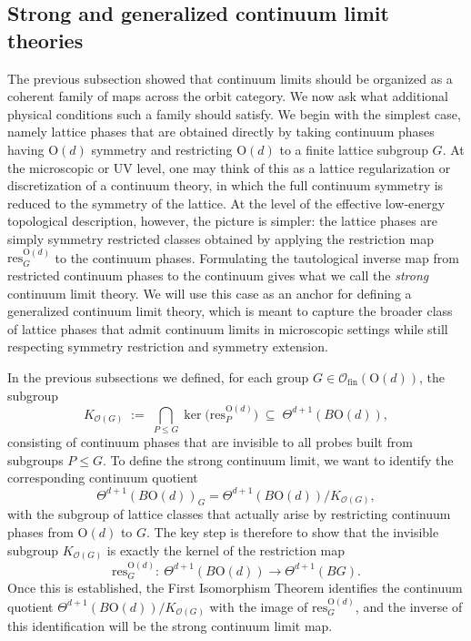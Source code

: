 \documentclass[aps,prx,reprint,superscriptaddress,twocolumn,amsmath,amssymb,amsfonts, nofootinbib]{revtex4-2}
\newcommand{\ofin}{\mathcal{O}_{\text{fin}}}
\newcommand{\res}{\text{res}}
\theoremstyle{apsstyle}
\begin{document}
\subsection{Strong and generalized continuum limit theories} 
\label{sec:strong_continuum_limit}
The previous subsection showed that continuum limits should be organized as a coherent family of maps across the orbit category. We now ask what additional physical conditions such a family should satisfy. We begin with the simplest case, namely lattice phases that are obtained directly by taking continuum phases having $\mathrm{O}(d)$ symmetry and restricting $\mathrm{O}(d)$ to a finite lattice subgroup $G$. At the microscopic or UV level, one may think of this as a lattice regularization or discretization of a continuum theory, in which the full continuum symmetry is reduced to the symmetry of the lattice.  At the level of the effective low-energy topological description, however, the picture is simpler: the lattice phases are simply symmetry restricted classes obtained by applying the restriction map $\res^{\mathrm{O}(d)}_{G}$ to the continuum phases. Formulating the tautological inverse map from restricted continuum phases to the continuum gives what we call the \emph{strong} continuum limit theory. We will use this case as an anchor for defining a generalized continuum limit theory, which is meant to capture the broader class of lattice phases that admit continuum limits in microscopic settings while still respecting symmetry restriction and symmetry extension.

\bigskip 

In the previous subsections we defined, for each group $G\in\ofin(\mathrm{O}(d))$, the subgroup
\begin{equation*}
    K_{\mathcal{O}(G)}
    \;:=\;
    \bigcap_{P\le G}\ker\bigl(\res^{\mathrm{O}(d)}_{P}\bigr)
    \;\subseteq\;
    \Theta^{d+1}(B\mathrm{O}(d)),
\end{equation*}
consisting of continuum phases that are invisible to all probes built from subgroups $P\le G$.  To define the strong continuum limit, we want to identify the corresponding continuum quotient
\begin{equation*}
\Theta^{d+1}(B\mathrm{O}(d))_{G} = \Theta^{d+1}(B\mathrm{O}(d))/K_{\mathcal O(G)},
\end{equation*}
with the subgroup of lattice classes that actually arise by restricting continuum phases from $\mathrm{O}(d)$ to $G$. The key step is therefore to show that the invisible subgroup $K_{\mathcal O(G)}$ is exactly the kernel of the restriction map
\begin{equation*}
    \res^{\mathrm{O}(d)}_{G}:\ \Theta^{d+1}(B\mathrm{O}(d))\longrightarrow \Theta^{d+1}(BG).
\end{equation*}
Once this is established, the First Isomorphism Theorem identifies the continuum quotient $\Theta^{d+1}(B\mathrm{O}(d))/K_{\mathcal O(G)}$ with the image of $\res^{\mathrm{O}(d)}_{G}$, and the inverse of this identification will be the strong continuum limit map.
\end{document}
